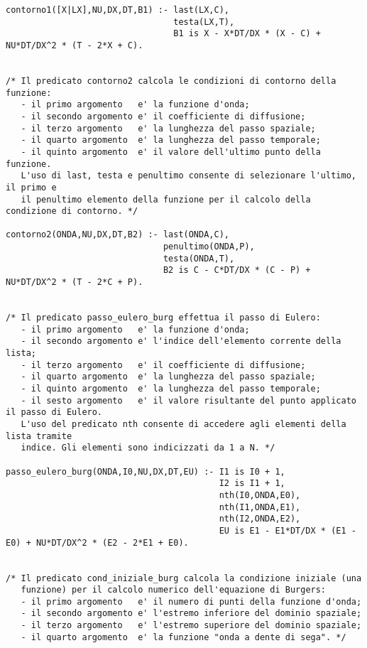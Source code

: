\begin{verbatim}
contorno1([X|LX],NU,DX,DT,B1) :- last(LX,C),
                                 testa(LX,T),
                                 B1 is X - X*DT/DX * (X - C) + NU*DT/DX^2 * (T - 2*X + C).


/* Il predicato contorno2 calcola le condizioni di contorno della funzione:
   - il primo argomento   e' la funzione d'onda;
   - il secondo argomento e' il coefficiente di diffusione;
   - il terzo argomento   e' la lunghezza del passo spaziale;
   - il quarto argomento  e' la lunghezza del passo temporale;
   - il quinto argomento  e' il valore dell'ultimo punto della funzione.
   L'uso di last, testa e penultimo consente di selezionare l'ultimo, il primo e
   il penultimo elemento della funzione per il calcolo della condizione di contorno. */

contorno2(ONDA,NU,DX,DT,B2) :- last(ONDA,C),
                               penultimo(ONDA,P),
                               testa(ONDA,T),
                               B2 is C - C*DT/DX * (C - P) + NU*DT/DX^2 * (T - 2*C + P).


/* Il predicato passo_eulero_burg effettua il passo di Eulero:
   - il primo argomento   e' la funzione d'onda;
   - il secondo argomento e' l'indice dell'elemento corrente della lista;
   - il terzo argomento   e' il coefficiente di diffusione;
   - il quarto argomento  e' la lunghezza del passo spaziale;
   - il quinto argomento  e' la lunghezza del passo temporale;
   - il sesto argomento   e' il valore risultante del punto applicato il passo di Eulero.
   L'uso del predicato nth consente di accedere agli elementi della lista tramite
   indice. Gli elementi sono indicizzati da 1 a N. */

passo_eulero_burg(ONDA,I0,NU,DX,DT,EU) :- I1 is I0 + 1,
                                          I2 is I1 + 1,
                                          nth(I0,ONDA,E0),
                                          nth(I1,ONDA,E1),
                                          nth(I2,ONDA,E2),
                                          EU is E1 - E1*DT/DX * (E1 - E0) + NU*DT/DX^2 * (E2 - 2*E1 + E0).


/* Il predicato cond_iniziale_burg calcola la condizione iniziale (una 
   funzione) per il calcolo numerico dell'equazione di Burgers:
   - il primo argomento   e' il numero di punti della funzione d'onda;
   - il secondo argomento e' l'estremo inferiore del dominio spaziale;
   - il terzo argomento   e' l'estremo superiore del dominio spaziale; 
   - il quarto argomento  e' la funzione "onda a dente di sega". */


\end{verbatim}
